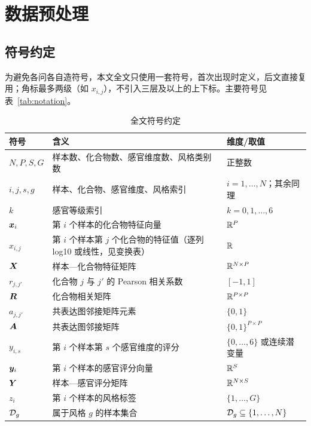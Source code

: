
\section{数据预处理}
\label{sec:preprocess}

\subsection{符号约定}

为避免各问各自造符号，本文全文只使用一套符号，首次出现时定义，后文直接复用；角标最多两级（如 $x_{i,j}$），不引入三层及以上的上下标。主要符号见表~\ref{tab:notation}。

\begin{longtable}{@{}p{} p{} p{}@{}}
  \caption{全文符号约定}\\
  \toprule
  符号 & 含义 & 维度/取值 \\
  \midrule
  \endhead
  $N,P,S,G$ & 样本数、化合物数、感官维度数、风格类别数 & 正整数 \\
  $i,j,s,g$ & 样本、化合物、感官维度、风格索引 & $i=1,\dots,N$；其余同理 \\
  $k$ & 感官等级索引 & $k=0,1,\dots,6$ \\
  $\bm{x}_i$ & 第 $i$ 个样本的化合物特征向量 & $\mathbb{R}^{P}$ \\
  $x_{i,j}$ & 第 $i$ 个样本第 $j$ 个化合物的特征值（逐列 log10 或线性，见变换表） & $\mathbb{R}$ \\
  $\bm{X}$ & 样本—化合物特征矩阵 & $\mathbb{R}^{N\times P}$ \\
  $r_{j,j'}$ & 化合物 $j$ 与 $j'$ 的 Pearson 相关系数 & $[-1,1]$ \\
  $\bm{R}$ & 化合物相关矩阵 & $\mathbb{R}^{P\times P}$ \\
  $a_{j,j'}$ & 共表达图邻接矩阵元素 & $\{0,1\}$ \\
  $\bm{A}$ & 共表达图邻接矩阵 & $\{0,1\}^{P\times P}$ \\
  $y_{i,s}$ & 第 $i$ 个样本第 $s$ 个感官维度的评分 & $\{0,\dots,6\}$ 或连续潜变量 \\
  $\bm{y}_i$ & 第 $i$ 个样本的感官评分向量 & $\mathbb{R}^{S}$ \\
  $\bm{Y}$ & 样本—感官评分矩阵 & $\mathbb{R}^{N\times S}$ \\
  $z_i$ & 第 $i$ 个样本的风格标签 & $\{1,\dots,G\}$ \\
  $\mathcal{D}_g$ & 属于风格 $g$ 的样本集合 & $\mathcal{D}_g\subseteq\{1,\dots,N\}$ \\

\end{longtable}
